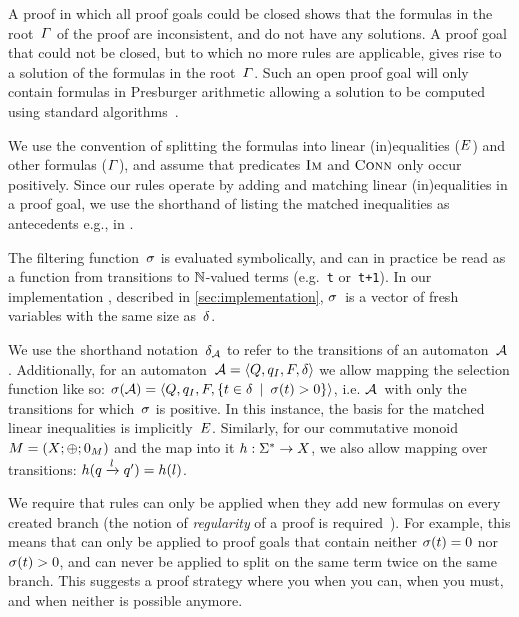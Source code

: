 A proof in which all proof goals could be closed shows that the formulas
in the root~$\varGamma$ of the proof are inconsistent, and do not
have any solutions. A proof goal that could not be closed, but to which no
more rules are applicable, gives rise to  a solution of the formulas in the
root~$\varGamma$. Such an open proof goal will only contain formulas
in Presburger arithmetic allowing a solution to be computed using
standard algorithms~\cite{Fitting96a}.

We use the convention of splitting the formulas into linear (in)equalities
($E$) and other formulas ($\varGamma$), and assume that
predicates $\operatorname{\textsc{Im}}$ and $\operatorname{\textsc{Conn}}$ only occur positively. Since our rules
operate by adding and matching linear (in)equalities in a proof goal, we use the
shorthand of listing the matched inequalities as antecedents e.g., in
\Propagate{}.

The filtering function~$\operatorname{\sigma}$ is evaluated symbolically, and can in practice
be read as a function from transitions to $\mathbb{N}$-valued terms
(e.g.~\texttt{t} or~\texttt{t+1}). In our implementation \Catra{}, described in
\cref{sec:implementation}, $\operatorname{\sigma}$~is a vector of fresh variables with the
same size as~$\delta$.

We use the shorthand notation~$\delta_{\mathcal{A}}$ to refer to the
transitions of an automaton~$\mathcal{A}$. Additionally, for an
automaton~$\mathcal{A} = \left\langle Q, q_I, F, \delta\right\rangle$ we allow mapping the selection function
like so: $\operatorname{\sigma}(\mathcal{A}) = \left\langle Q, q_I, F,
\left\{t \in \delta \:\mid\: \operatorname{\sigma}(t) > 0\right\}\right\rangle$, i.e.
$\mathcal{A}$~with only the transitions for which~$\operatorname{\sigma}$ is positive. In this
instance, the basis for the matched linear inequalities is
implicitly~$E$. Similarly, for our commutative monoid $M =
\left(X;\operatorname{\oplus};0_{M}\right)$ and the map into it $h : \Sigma^*
\rightarrow X$, we also allow mapping over transitions:
$h(q \xrightarrow{l} q') = h(l)$.

We require that rules can only be applied when they add new formulas
on every created branch (the notion of \emph{regularity} of a proof is
required~\cite{Fitting96a}). For example, this means that \Split{} can
only be applied to proof goals that contain neither
$\operatorname{\sigma}(t) = 0$ nor $\operatorname{\sigma}(t) > 0$, and can
never be applied to split on the same term twice on the same branch.
This suggests a proof strategy where you \Propagate{} when you can, \Split{}
when you must, and \Subsume{} when neither is possible anymore.


